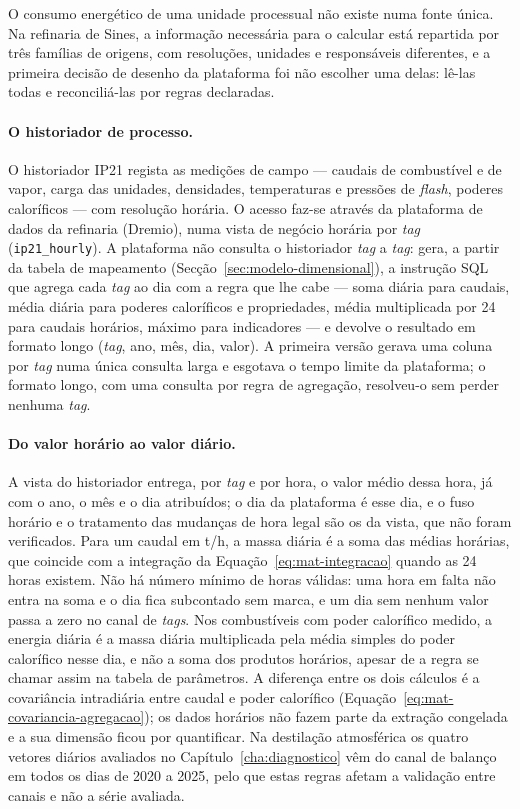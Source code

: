 O consumo energético de uma unidade processual não existe numa fonte
única. Na refinaria de Sines, a informação necessária para o calcular está
repartida por três famílias de origens, com resoluções, unidades e
responsáveis diferentes, e a primeira decisão de desenho da plataforma foi
não escolher uma delas: lê-las todas e reconciliá-las por regras
declaradas.

\paragraph{O historiador de processo.} O historiador IP21 regista as
medições de campo --- caudais de combustível e de vapor, carga das
unidades, densidades, temperaturas e pressões de \emph{flash}, poderes
caloríficos --- com resolução horária. O acesso faz-se através da
plataforma de dados da refinaria (Dremio), numa vista de negócio horária
por \emph{tag} (\texttt{ip21\_hourly}). A plataforma não consulta o
historiador \emph{tag} a \emph{tag}: gera, a partir da tabela de mapeamento
(Secção~\ref{sec:modelo-dimensional}), a instrução SQL que agrega cada
\emph{tag} ao dia com a regra que lhe cabe --- soma diária para caudais,
média diária para poderes caloríficos e propriedades, média multiplicada
por 24 para caudais horários, máximo para indicadores --- e devolve o
resultado em formato longo (\emph{tag}, ano, mês, dia, valor). A primeira
versão gerava uma coluna por \emph{tag} numa única consulta larga e
esgotava o tempo limite da plataforma; o formato longo, com uma consulta
por regra de agregação, resolveu-o sem perder nenhuma \emph{tag}.

\paragraph{Do valor horário ao valor diário.} A vista do historiador
entrega, por \emph{tag} e por hora, o valor médio dessa hora, já com o ano, o
mês e o dia atribuídos; o dia da plataforma é esse dia, e o fuso horário e
o tratamento das mudanças de hora legal são os da vista, que não foram
verificados. Para um caudal em t/h, a massa diária é a soma das médias
horárias, que coincide com a integração da
Equação~\eqref{eq:mat-integracao} quando as 24 horas existem. Não há número
mínimo de horas válidas: uma hora em falta não entra na soma e o dia fica
subcontado sem marca, e um dia sem nenhum valor passa a zero no canal de
\emph{tags}. Nos combustíveis com poder calorífico medido, a energia diária
é a massa diária multiplicada pela média simples do poder calorífico nesse
dia, e não a soma dos produtos horários, apesar de a regra se chamar assim
na tabela de parâmetros. A diferença entre os dois cálculos é a covariância
intradiária entre caudal e poder calorífico
(Equação~\eqref{eq:mat-covariancia-agregacao}); os dados horários não fazem
parte da extração congelada e a sua dimensão ficou por quantificar. Na
destilação atmosférica os quatro vetores diários avaliados no
Capítulo~\ref{cha:diagnostico} vêm do canal de balanço em todos os dias de
2020 a 2025, pelo que estas regras afetam a validação entre canais e não a
série avaliada.

